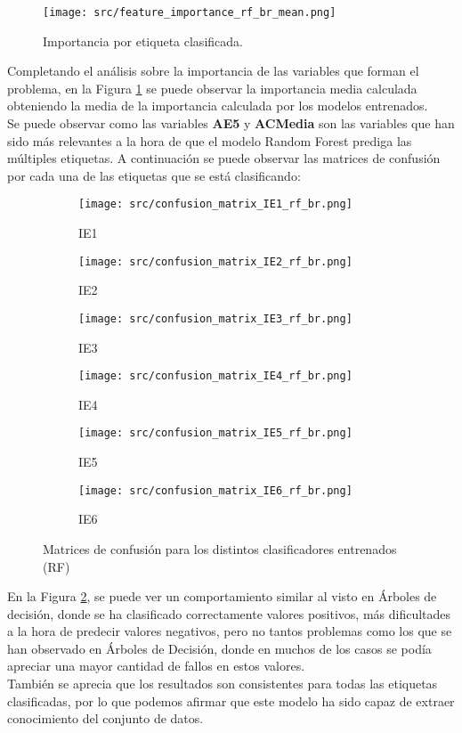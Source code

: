 \begin{figure}[H]
	\centering
	\texttt{[image: src/feature\_importance\_rf\_br\_mean.png]}
	\caption{Importancia por etiqueta clasificada.}
	\label{fig:rf_br_mean}
\end{figure}
Completando el análisis sobre la importancia de las variables que forman el problema, en la Figura \ref{fig:rf_br_mean} se puede observar la importancia media calculada obteniendo la media de la importancia calculada por los modelos entrenados.\\
Se puede observar como las variables \textbf{AE5} y \textbf{ACMedia} son las variables que han sido más relevantes a la hora de que el modelo Random Forest prediga las múltiples etiquetas.
\clearpage
A continuación se puede observar las matrices de confusión por cada una de las etiquetas que se está clasificando:
\begin{figure}[H]
	\centering
	\begin{subfigure}[b]{0.3\textwidth}
		\centering
		\texttt{[image: src/confusion\_matrix\_IE1\_rf\_br.png]}
		\caption{IE1}
	\end{subfigure}
	\hfill
	\begin{subfigure}[b]{0.3\textwidth}
		\centering
		\texttt{[image: src/confusion\_matrix\_IE2\_rf\_br.png]}
		\caption{IE2}
	\end{subfigure}
	\hfill
	\begin{subfigure}[b]{0.3\textwidth}
		\centering
		\texttt{[image: src/confusion\_matrix\_IE3\_rf\_br.png]}
		\caption{IE3}
	\end{subfigure}
	\hfill
	\begin{subfigure}[b]{0.3\textwidth}
		\centering
		\texttt{[image: src/confusion\_matrix\_IE4\_rf\_br.png]}
		\caption{IE4}
	\end{subfigure}
	\hfill
	\begin{subfigure}[b]{0.3\textwidth}
		\centering
		\texttt{[image: src/confusion\_matrix\_IE5\_rf\_br.png]}
		\caption{IE5}
	\end{subfigure}
	\hfill
	\begin{subfigure}[b]{0.3\textwidth}
		\centering
		\texttt{[image: src/confusion\_matrix\_IE6\_rf\_br.png]}
		\caption{IE6}
	\end{subfigure}
	\caption{Matrices de confusión para los distintos clasificadores entrenados (RF)}
	\label{fig:ml_conf_matrix_rf}
\end{figure}
En la Figura \ref{fig:ml_conf_matrix_rf}, se puede ver un comportamiento similar al visto en Árboles de decisión, donde se ha clasificado correctamente valores positivos, más dificultades a la hora de predecir valores negativos, pero no tantos problemas como los que se han observado en Árboles de Decisión, donde en muchos de los casos se podía apreciar una mayor cantidad de fallos en estos valores.\\
\linebreak
También se aprecia que los resultados son consistentes para todas las etiquetas clasificadas, por lo que podemos afirmar que este modelo ha sido capaz de extraer conocimiento del conjunto de datos.
\clearpage
